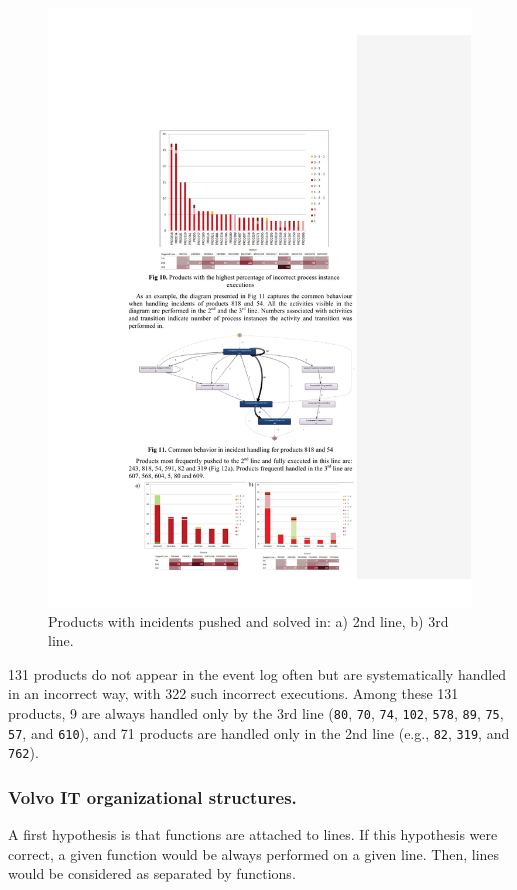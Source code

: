 \documentclass[lnbip]{svmultln}
\begin{document}
\begin{figure}
\centering
\includegraphics[width=\textwidth]{"figs/pic 14"}
\caption{Products with incidents pushed and solved in: a) 2nd line, b) 3rd line.}
\label{fig:productsSolvedIn2ndNad3rdLine}
\end{figure}


131 products do not appear in the event log often but are systematically handled in an incorrect way, with 322 such incorrect executions. Among these 131 products, 9 are always handled only by the 3rd line (\texttt{80}, \texttt{70}, \texttt{74}, \texttt{102}, \texttt{578}, \texttt{89}, \texttt{75}, \texttt{57}, and \texttt{610}), and 71 products are handled only in the 2nd line (e.g., \texttt{82}, \texttt{319}, and \texttt{762}).

\subsubsection{Volvo IT organizational structures.} A first hypothesis is that functions are attached to lines. If this hypothesis were correct, a given function would be always performed on a given line. Then, lines would be considered as separated by functions.
\end{document}
